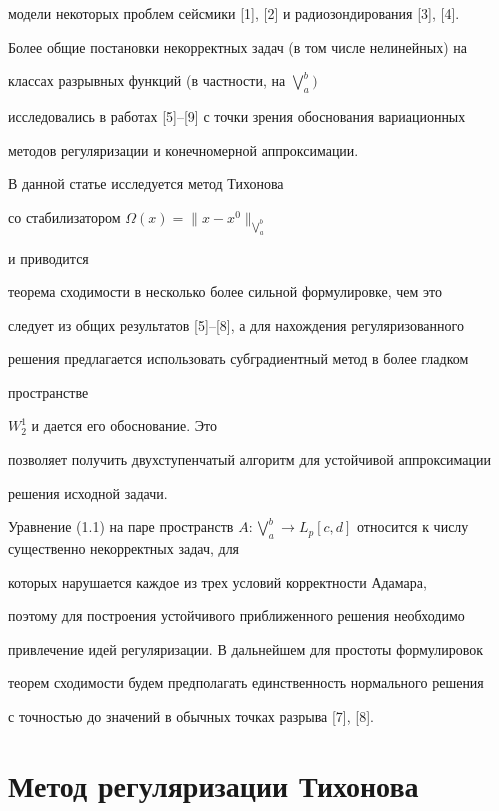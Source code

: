 модели некоторых проблем сейсмики [1], [2] и радиозондирования [3], [4].


Более общие постановки некорректных задач (в том числе нелинейных) на


классах разрывных функций (в частности, на $\bigvee\limits_a^b)$


исследовались в работах [5]--[9] с точки зрения обоснования вариационных


методов регуляризации и конечномерной аппроксимации.





В данной статье исследуется метод Тихонова


со стабилизатором $\Omega (x) = \|x-x^0\|_{\bigvee \limits_a^b }$


и приводится


теорема сходимости в несколько более сильной формулировке, чем это


следует из общих результатов [5]--[8], а для нахождения регуляризованного


решения предлагается использовать субградиентный метод в более гладком


пространстве


$W_2^1$ и дается его обоснование. Это


позволяет получить двухступенчатый алгоритм для устойчивой аппроксимации


решения исходной задачи.





Уравнение (1.1) на паре пространств $A: \bigvee\limits_a^b\to


L_p [c,d]$ относится к числу существенно некорректных задач, для


которых нарушается каждое из трех условий корректности Адамара,


поэтому для построения устойчивого приближенного решения необходимо


привлечение идей регуляризации. В дальнейшем для простоты формулировок


теорем сходимости будем предполагать единственность нормального решения


с точностью до значений в обычных точках разрыва [7], [8].





\section{Метод регуляризации Тихонова}





